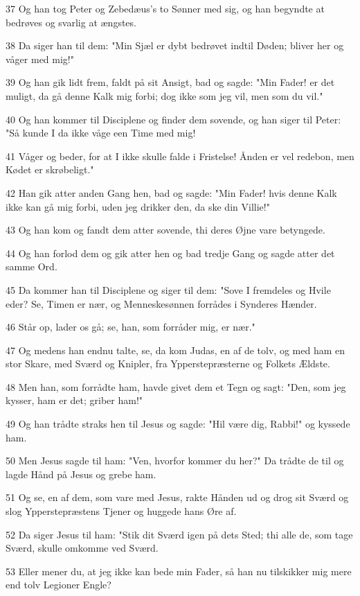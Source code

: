 \par 37 Og han tog Peter og Zebedæus's to Sønner med sig, og han begyndte at bedrøves og svarlig at ængstes.
\par 38 Da siger han til dem: "Min Sjæl er dybt bedrøvet indtil Døden; bliver her og våger med mig!"
\par 39 Og han gik lidt frem, faldt på sit Ansigt, bad og sagde: "Min Fader! er det muligt, da gå denne Kalk mig forbi; dog ikke som jeg vil, men som du vil."
\par 40 Og han kommer til Disciplene og finder dem sovende, og han siger til Peter: "Så kunde I da ikke våge een Time med mig!
\par 41 Våger og beder, for at I ikke skulle falde i Fristelse! Ånden er vel redebon, men Kødet er skrøbeligt."
\par 42 Han gik atter anden Gang hen, bad og sagde: "Min Fader! hvis denne Kalk ikke kan gå mig forbi, uden jeg drikker den, da ske din Villie!"
\par 43 Og han kom og fandt dem atter sovende, thi deres Øjne vare betyngede.
\par 44 Og han forlod dem og gik atter hen og bad tredje Gang og sagde atter det samme Ord.
\par 45 Da kommer han til Disciplene og siger til dem: "Sove I fremdeles og Hvile eder? Se, Timen er nær, og Menneskesønnen forrådes i Synderes Hænder.
\par 46 Står op, lader os gå; se, han, som forråder mig, er nær."
\par 47 Og medens han endnu talte, se, da kom Judas, en af de tolv, og med ham en stor Skare, med Sværd og Knipler, fra Ypperstepræsterne og Folkets Ældste.
\par 48 Men han, som forrådte ham, havde givet dem et Tegn og sagt: "Den, som jeg kysser, ham er det; griber ham!"
\par 49 Og han trådte straks hen til Jesus og sagde: "Hil være dig, Rabbi!" og kyssede ham.
\par 50 Men Jesus sagde til ham: "Ven, hvorfor kommer du her?" Da trådte de til og lagde Hånd på Jesus og grebe ham.
\par 51 Og se, en af dem, som vare med Jesus, rakte Hånden ud og drog sit Sværd og slog Ypperstepræstens Tjener og huggede hans Øre af.
\par 52 Da siger Jesus til ham: "Stik dit Sværd igen på dets Sted; thi alle de, som tage Sværd, skulle omkomme ved Sværd.
\par 53 Eller mener du, at jeg ikke kan bede min Fader, så han nu tilskikker mig mere end tolv Legioner Engle?
